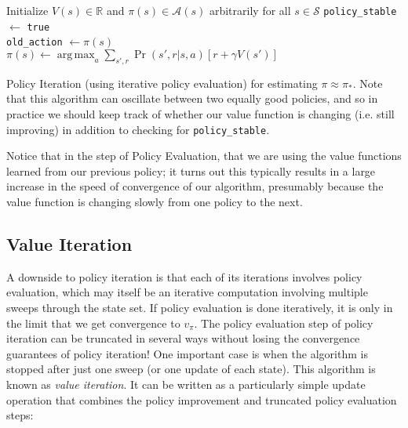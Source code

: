 \documentclass[12pt]{article}
\DeclareMathOperator*{\argmax}{arg\,max}
\begin{document}
\begin{algorithm}
  Initialize $V(s) \in \mathbb R$ and $\pi(s) \in \mathcal A(s)$ arbitrarily for   all $s \in \mathcal S$ 
\texttt{policy\_stable} $\gets$ \texttt{true} \\
 {
  \texttt{old\_action} $\gets \pi(s)$ \\
  $\pi(s) \gets \argmax_a \sum_{s',r} \Pr(s',r|s,a) \left[r + \gamma     V(s')\right]$ \\
}
 {
} 
\caption{Policy Iteration (using iterative policy evaluation) for estimating $\pi \approx \pi_*$. Note that this algorithm can oscillate between two equally good policies, and so in practice we should keep track of whether our value function is changing (i.e. still improving) in addition to checking for \texttt{policy\_stable}.}
\end{algorithm}
Notice that in the step of Policy Evaluation, that we are using the value functions learned from our previous policy; it turns out this typically results in a large increase in the speed of convergence of our algorithm, presumably because the value function is changing slowly from one policy to the next.
\subsection{Value Iteration}

A downside to policy iteration is that each of its iterations involves policy evaluation, which may itself be an iterative computation involving multiple sweeps through the state set. If policy evaluation is done iteratively, it is only in the limit that we get convergence to $v_\pi$. The policy evaluation step of policy iteration can be truncated in several ways without losing the convergence guarantees of policy iteration! One important case is when the algorithm is stopped after just one sweep (or one update of each state). This algorithm is known as \emph{value iteration}. It can be written as a particularly simple update operation that combines the policy improvement and truncated policy evaluation steps:
\end{document}
